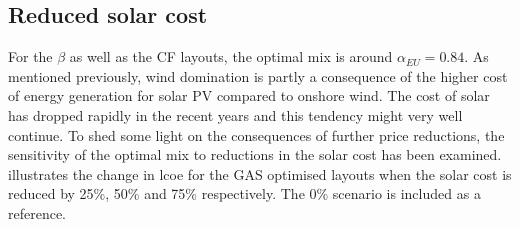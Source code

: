 \documentclass[a4paper, 5p, sort&compress]{elsarticle}%
\begin{document}
%
%

\subsection{Reduced solar cost}
\label{sec:reduced-solar-cost}

For the $\beta$ as well as the CF layouts, the optimal mix is around
$\alpha_{EU}=0.84$. As mentioned previously, wind domination is partly a
consequence of the higher cost of energy generation for solar PV
compared to onshore wind. The cost of solar has dropped rapidly in the
recent years and this tendency might very well continue. To shed some
light on the consequences of further price reductions, the sensitivity
of the optimal mix to reductions in the solar cost has been
examined.  illustrates the change in \gls{lcoe} for the
GAS optimised layouts when the solar cost is reduced by 25\%, 50\% and
75\% respectively. The 0\% scenario is included as a reference.
\end{document}
